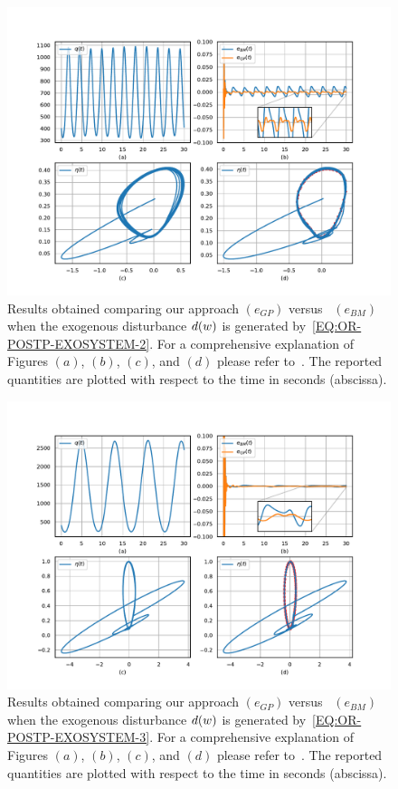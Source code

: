 \begin{figure}[!t]
	\centering
	\includegraphics[width=1.\textwidth]{Figs/Chapter8-9/postprocessing_pow_example.pdf}
	\caption{Results obtained comparing our approach $(e_{GP})$ versus~\cite{bin2019class} $(e_{BM})$ when the exogenous disturbance $d(w)$ is generated by~\eqref{EQ:OR-POSTP-EXOSYSTEM-2}.
	For a comprehensive explanation of Figures $(a)$, $(b)$, $(c)$, and $(d)$ please refer to~. The reported quantities are plotted with respect to the time in seconds (abscissa).}
	\label{FIG:OR-POSTPROCESSING-POW-RESULTS}
\end{figure}
\begin{figure}[!t]
	\centering
	\includegraphics[width=1.\textwidth]{Figs/Chapter8-9/postprocessing_atan_example.pdf}
	\caption{Results obtained comparing our approach $(e_{GP})$ versus~\cite{bin2019class} $(e_{BM})$ when the exogenous disturbance $d(w)$ is generated by~\eqref{EQ:OR-POSTP-EXOSYSTEM-3}.
	For a comprehensive explanation of Figures $(a)$, $(b)$, $(c)$, and $(d)$ please refer to~. The reported quantities are plotted with respect to the time in seconds (abscissa).}
	\label{FIG:OR-POSTPROCESSING-ATAN-RESULTS}
\end{figure}
